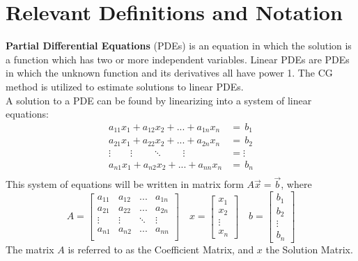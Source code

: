 \section{Relevant Definitions and Notation}
\textbf{Partial  Differential  Equations} (PDEs) is an equation in which the solution is a function which has two or more independent variables. Linear PDEs are PDEs in which the unknown function and its derivatives all have power 1. The  CG method  is  utilized  to  estimate  solutions  to  linear  PDEs.
\\
A solution to a PDE can be found by linearizing into a system of linear equations:
\begin{align*}
  a_{11}x_{1} + a_{12}x_{2} + ...   + a_{1n}x_{n} &= \, b_{1} \\ 
  a_{21}x_{1} + a_{22}x_{2} + ...    + a_{2n}x_{n} &= \, b_{2} \\ 
  \vdots   \qquad  \vdots \qquad  \ddots  \qquad  \vdots &= \vdots \\ 
  a_{n1}x_{1} + a_{n2}x_{2} + ...    + a_{nn}x_{n} &= \, b_{n} \\ 
\end{align*}
This system of equations will be written in matrix form $A\vec{x}=\vec{b}$, where 
\begin{equation}
A = \begin{bmatrix}
       a_{11} & a_{12} & ... & a_{1n} \\
       a_{21} & a_{22} & ... & a_{2n} \\
       \vdots & \vdots & \ddots & \vdots \\
       a_{n1} & a_{n2} & ... & a_{nn} \\
     \end{bmatrix}
\quad
x=\begin{bmatrix}
x_{1} \\ x_{2} \\ \vdots \\ x_{n}
\end{bmatrix}
\quad
b=\begin{bmatrix}
b_{1} \\ b_{2} \\ \vdots \\ b_{n}
\end{bmatrix}
\end{equation}
The matrix $A$ is referred to as the Coefficient Matrix, and $x$ the Solution Matrix.
\\
